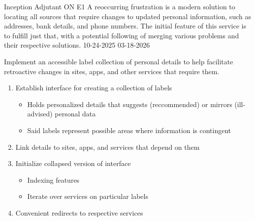 \documentclass[7px]{article}
\begin{document}
\frontmatter
{Inception}
{Adjutant}
{ON}
{E1}
{A reoccurring frustration is a modern solution to locating all sources that require changes to updated personal information, such as addresses, bank details, and phone numbers. The initial feature of this service is to fulfill just that, with a potential following of merging various problems and their respective solutions.}
{10-24-2025}
{03-18-2026}

\strategy
{Implement an accessible label collection of personal details to help facilitate retroactive changes in sites, apps, and other services that require them.}
{
  \begin{enumerate}
    \small
    \item Establish interface for creating a collection of labels
      \begin{itemize}[label=$\multimapdotinv$, leftmargin=3mm]
        \item Holds personalized details that suggests (reccommended) or mirrors (ill-advised) personal data
        \item Said labels represent possible areas where information is contingent
      \end{itemize}
    \item Link details to sites, apps, and services that depend on them
    \item Initialize collapsed version of interface
      \begin{itemize}[label=$\multimapdotinv$, leftmargin=3mm]
        \item Indexing features
        \item Iterate over services on particular labels
      \end{itemize}
    \item Convenient redirects to respective services
  \end{enumerate}
}
\end{document}
